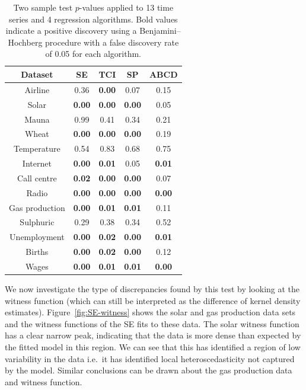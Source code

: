 \documentclass{article} %
\def\ie{i.e.\ }
\begin{document}
\begin{table}[ht]
\center
\begin{tabular}{|c|c|c|c|c|}
\hline
Dataset & SE & TCI & SP & ABCD \\
\hline
Airline        & 0.36 & \bf{0.00} & 0.07 & 0.15 \\
Solar          & \bf{0.00} & \bf{0.00} & \bf{0.00} & 0.05 \\
Mauna          & 0.99 & 0.41 & 0.34 & 0.21 \\
Wheat          & \bf{0.00} & \bf{0.00} & \bf{0.00} & 0.19 \\
Temperature    & 0.54 & 0.83 & 0.68 & 0.75 \\
Internet       & \bf{0.00} & \bf{0.01} & 0.05 & \bf{0.01} \\
Call centre    & \bf{0.02} & \bf{0.00} & \bf{0.00} & 0.07 \\
Radio          & \bf{0.00} & \bf{0.00} & \bf{0.00} & \bf{0.00} \\
Gas production & \bf{0.00} & \bf{0.01} & \bf{0.01} & 0.11 \\
Sulphuric      & 0.29 & 0.38 & 0.34 & 0.52 \\
Unemployment   & \bf{0.00} & \bf{0.02} & \bf{0.00} & \bf{0.01} \\
Births         & \bf{0.00} & \bf{0.02} & \bf{0.00} & 0.12 \\
Wages          & \bf{0.00} & \bf{0.01} & \bf{0.01} & \bf{0.00} \\
\hline
\end{tabular}
\caption{Two sample test $p$-values applied to 13 time series and 4 regression algorithms.
Bold values indicate a positive discovery using a Benjamini--Hochberg procedure with a false discovery rate of 0.05 for each algorithm.}
\label{table:ABCD-p-values}
\end{table}

We now investigate the type of discrepancies found by this test by looking at the witness function (which can still be interpreted as the difference of kernel density estimates).
Figure~\ref{fig:SE-witness} shows the solar and gas production data sets and the witness functions of the SE fits to these data.
The solar witness function has a clear narrow peak, indicating that the data is more dense than expected by the fitted model in this region.
We can see that this has identified a region of low variability in the data \ie it has identified local heteroscedasticity not captured by the model.
Similar conclusions can be drawn about the gas production data and witness function.
\end{document}

